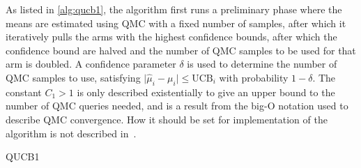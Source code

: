 As listed in \cref{alg:qucb1}, the algorithm first runs a preliminary phase where the means are estimated using QMC with a fixed number of samples, after which it iteratively pulls the arms with the highest confidence bounds, after which the confidence bound are halved and the number of QMC samples to be used for that arm is doubled.
A confidence parameter $\delta$ is used to determine the number of QMC samples to use, satisfying $\lvert\hat{\mu}_i - \mu_i\rvert \leq \text{UCB}_i$ with probability $1-\delta$.
The constant $C_1>1$ is only described existentially to give an upper bound to the number of QMC queries needed, and is a result from the big-O notation used to describe QMC convergence.
How it should be set for implementation of the algorithm is not described in~\autocite{wan2022}.


\begin{algorithm}
    \SetAlgoLined
    \caption{QUCB1}
    \label{alg:qucb1}
\end{algorithm}

